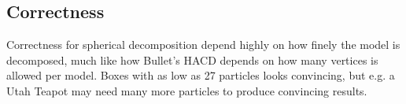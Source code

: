 \subsection{Correctness}
Correctness for spherical decomposition depend highly on how finely the model is
decomposed, much like how Bullet's HACD depends on how many vertices is allowed
per model. Boxes with as low as 27 particles looks convincing, but e.g. a Utah Teapot
may need many more particles to produce convincing results.
